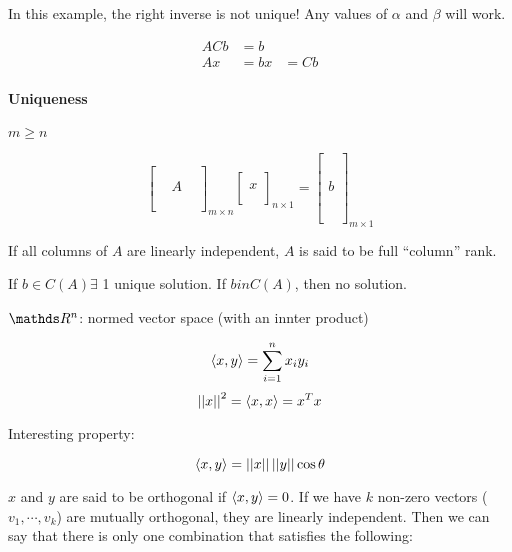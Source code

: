 In this example, the right inverse is not unique! Any values of $\alpha$ and $\beta$ will work.
  
\begin{align*}
  ACb &= b \\
  Ax &= b
  x &= Cb
\end{align*}

\paragraph{Uniqueness} $m \ge n$

\[
  \begin{bmatrix}
    & & \\
    & & \\
    & A & \\
    & & \\
    & & \\
  \end{bmatrix}_{m \times n}
  \begin{bmatrix}
    \\ x \\ \\
  \end{bmatrix}_{n \times 1} = 
  \begin{bmatrix}
    \\ \\ \\ \\ b \\ \\ \\ \\ \\
  \end{bmatrix}_{m \times 1}
\]

If all columns of $A$ are linearly independent, $A$ is said to be full ``column'' rank.

If $b \in C(A) \exists$ 1 unique solution. If $b \!in C(A)$, then no solution.

$\bbR^n$: normed vector space (with an innter product)

\[
  \langle x,y\rangle = \sum_{i=1}^n x_i y_i
\]
\[
  \left|\left|x\right|\right|^2 = \langle x,x\rangle = x^T x
\]

Interesting property:

\[
  \langle x,y\rangle = \left|\left|x\right|\right|\left|\left|y\right|\right|\cos \theta
\]

$x$ and $y$ are said to be orthogonal if $\langle x,y\rangle = 0$. If we have $k$ non-zero vectors ($v_1,\cdots, v_k$) are mutually orthogonal, they are linearly independent. Then we can say that there is only one combination that satisfies the following:

